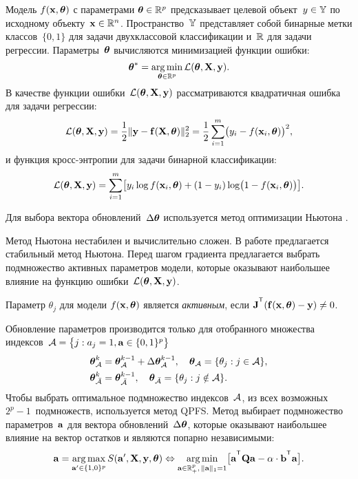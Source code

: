 \documentclass[11pt, a5paper]{dissert}
\begin{document}
Модель $f( \mathbf{x}, \boldsymbol{\theta})$ с параметрами $\boldsymbol{\theta} \in \mathbb{R}^p$ предсказывает целевой объект~$y \in \mathbb{Y}$ по исходному объекту~$\mathbf{x} \in \mathbb{R}^{n}$. Пространство~$\mathbb{Y}$ представляет собой бинарные метки классов~$\{0, 1\}$ для задачи двухклассовой классификации и~$\mathbb{R}$ для задачи регрессии.
Параметры~$\boldsymbol{\theta}$ вычисляются минимизацией функции ошибки:
\begin{equation}
	\boldsymbol{\theta}^* = \mathop{\arg \min}\limits_{\boldsymbol{\theta} \in \mathbb{R}^p} \mathcal{L}(\boldsymbol{\theta}, \mathbf{X}, \mathbf{y}).
	\label{ch4:eq:error_function}
\end{equation}
В качестве функции ошибки~$\mathcal{L} (\boldsymbol{\theta}, \mathbf{X}, \mathbf{y})$ рассматриваются квадратичная ошибка для задачи регрессии:
\begin{equation}
	\mathcal{L}(\boldsymbol{\theta}, \mathbf{X}, \mathbf{y}) = \frac 12 \| \mathbf{y} - \mathbf{f}(\mathbf{X}, \boldsymbol{\theta}) \|_2^2 = \frac 12 \sum_{i=1}^m \bigl( y_i - f(\mathbf{x}_i,  \boldsymbol{\theta})\bigr)^2,
	\label{ch4:eq:squared_error}
\end{equation}
и функция кросс-энтропии для задачи бинарной классификации: 
\begin{equation}
	\mathcal{L}(\boldsymbol{\theta}, \mathbf{X}, \mathbf{y}) = \sum_{i=1}^m \bigl[y_i \log f (\mathbf{x}_i , \boldsymbol{\theta}) + (1-y_i) \log \bigl(1 - f (\mathbf{x}_i , \boldsymbol{\theta})\bigr)\bigr].
	\label{ch4:eq:log_loss}
\end{equation}

Для выбора вектора обновлений~$\Delta \boldsymbol{\theta}$ используется метод оптимизации Ньютона .

Метод Ньютона нестабилен и вычислительно сложен. 
В работе предлагается стабильный метод Ньютона. 
Перед шагом градиента предлагается выбрать подмножество активных параметров модели, которые оказывают наибольшее влияние на функцию ошибки~$\mathcal{L} (\boldsymbol{\theta}, \mathbf{X}, \mathbf{y})$.
\begin{definition}
	\label{ch4:def:active_param}
	Параметр $\theta_j$ для модели $f(\mathbf{x}, \boldsymbol{\theta})$ является \textit{активным}, если $\bJ^{\T} (\mathbf{f}(\bx, \btheta) - \by) \neq 0$.
\end{definition}
Обновление параметров производится только для отобранного множества индексов~$\mathcal{A} = \bigl\{j: a_j = 1, \mathbf{a} \in \{0, 1\}^p\bigr\}$
\begin{align*}
	\boldsymbol{\theta}_{\mathcal{A}}^k &= \boldsymbol{\theta}_{\mathcal{A}}^{k - 1} + \Delta \boldsymbol{\theta}_{\mathcal{A}}^{k - 1}, \quad \boldsymbol{\theta}_{\mathcal{A}} = \{\theta_j: j \in \mathcal{A} \}, \\
	\boldsymbol{\theta}_{\bar{\mathcal{A}}}^k &= \boldsymbol{\theta}_{\bar{\mathcal{A}}}^{k - 1}, \quad \boldsymbol{\theta}_{\bar{\mathcal{A}}} = \{\theta_j: j \notin \mathcal{A} \}.
\end{align*}
Чтобы выбрать оптимальное подмножество индексов~$\mathcal{A}$, из всех возможных $2^p - 1$~подмножеств, используется метод QPFS. Метод выбирает подмножество параметров~$\mathbf{a}$ для вектора обновлений~$ \Delta \boldsymbol{\theta}$, которые оказывают наибольшее влияние на вектор остатков и являются попарно независимыми:
\begin{equation}
	\ba = \argmax_{\ba' \in \{1, 0\}^p} S(\ba', \bX, \by, \btheta) \Leftrightarrow \argmin_{\ba  \in \bbR^p_+, \, \|\ba\|_1=1} \bigl[\ba^{\T} \bQ \ba - \alpha \cdot \mathbf{b}^{\T} \ba \bigr].
\end{equation}
\end{document}
